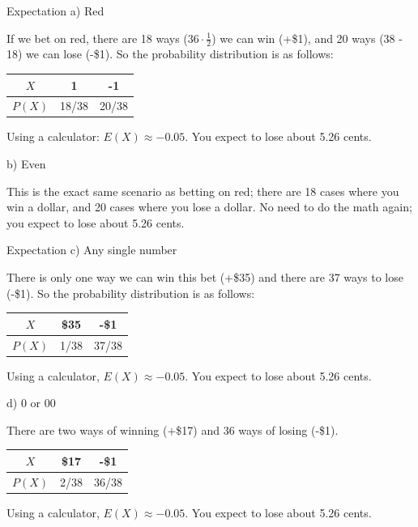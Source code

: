 \documentclass[t, aspectratio=169]{beamer}
\newcommand{\?}{\stackrel{?}{=}}
\begin{document}
	\begin{frame}{Expectation}
		a) Red \pause
		
		If we bet on red, there are 18 ways ($36 \cdot \frac12$) we can win (+\$1), and 20 ways (38 - 18) we can lose (-\$1). So the probability distribution is as follows: \pause
		
		\begin{tabular}{c|cc}
			$X$ & 1 & -1 \\ \hline
			$P(X)$ & 18/38 & 20/38
		\end{tabular} \pause
	
		Using a calculator: $E(X) \approx -0.05$. You expect to lose about 5.26 cents. \pause
		
		b) Even \pause
		
		This is the exact same scenario as betting on red; there are 18 cases where you win a dollar, and 20 cases where you lose a dollar. No need to do the math again; you expect to lose about 5.26 cents.
	\end{frame}

	\begin{frame}{Expectation}
		c) Any single number \pause
		
		There is only one way we can win this bet (+\$35) and there are 37 ways to lose (-\$1). So the probability distribution is as follows: \pause
		
		\begin{tabular}{c|cc}
			$X$ & \$35 & -\$1 \\ \hline
			$P(X)$ & 1/38 & 37/38
		\end{tabular} \pause
	
		Using a calculator, $E(X) \approx -0.05$. You expect to lose about 5.26 cents. \pause
		
		d) 0 or 00
		
		There are two ways of winning (+\$17) and 36 ways of losing (-\$1). \pause
		
		\begin{tabular}{c|cc}
			$X$ & \$17 & -\$1 \\ \hline
			$P(X)$ & 2/38 & 36/38
		\end{tabular} \pause
	
		Using a calculator, $E(X) \approx -0.05$. You expect to lose about 5.26 cents.
	\end{frame}
\end{document}
